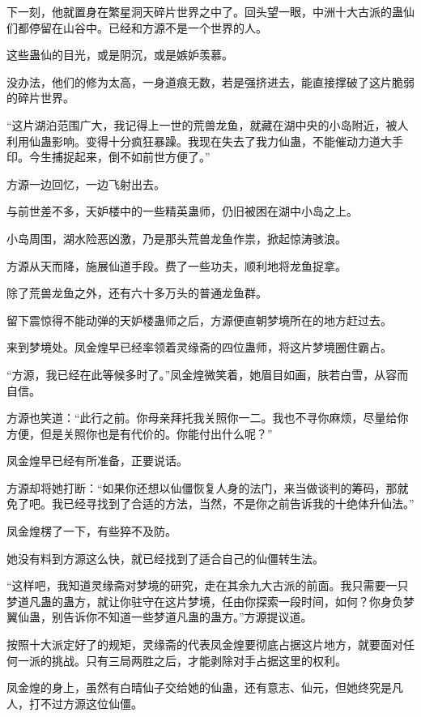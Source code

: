\begin{this_body}
下一刻，他就置身在繁星洞天碎片世界之中了。回头望一眼，中洲十大古派的蛊仙们都停留在山谷中。已经和方源不是一个世界的人。

这些蛊仙的目光，或是阴沉，或是嫉妒羡慕。

没办法，他们的修为太高，一身道痕无数，若是强挤进去，能直接撑破了这片脆弱的碎片世界。

“这片湖泊范围广大，我记得上一世的荒兽龙鱼，就藏在湖中央的小岛附近，被人利用仙蛊影响。变得十分疯狂暴躁。我现在失去了我力仙蛊，不能催动力道大手印。今生捕捉起来，倒不如前世方便了。”

方源一边回忆，一边飞射出去。

与前世差不多，天妒楼中的一些精英蛊师，仍旧被困在湖中小岛之上。

小岛周围，湖水险恶凶激，乃是那头荒兽龙鱼作祟，掀起惊涛骇浪。

方源从天而降，施展仙道手段。费了一些功夫，顺利地将龙鱼捉拿。

除了荒兽龙鱼之外，还有六十多万头的普通龙鱼群。

留下震惊得不能动弹的天妒楼蛊师之后，方源便直朝梦境所在的地方赶过去。

来到梦境处。凤金煌早已经率领着灵缘斋的四位蛊师，将这片梦境圈住霸占。

“方源，我已经在此等候多时了。”凤金煌微笑着，她眉目如画，肤若白雪，从容而自信。

方源也笑道：“此行之前。你母亲拜托我关照你一二。我也不寻你麻烦，尽量给你方便，但是关照你也是有代价的。你能付出什么呢？”

凤金煌早已经有所准备，正要说话。

方源却将她打断：“如果你还想以仙僵恢复人身的法门，来当做谈判的筹码，那就免了吧。我已经寻找到了合适的方法，当然，不是你之前告诉我的十绝体升仙法。”

凤金煌楞了一下，有些猝不及防。

她没有料到方源这么快，就已经找到了适合自己的仙僵转生法。

“这样吧，我知道灵缘斋对梦境的研究，走在其余九大古派的前面。我只需要一只梦道凡蛊的蛊方，就让你驻守在这片梦境，任由你探索一段时间，如何？你身负梦翼仙蛊，别告诉你不知道一些梦道凡蛊的蛊方。”方源提议道。

按照十大派定好了的规矩，灵缘斋的代表凤金煌要彻底占据这片地方，就要面对任何一派的挑战。只有三局两胜之后，才能剥除对手占据这里的权利。

凤金煌的身上，虽然有白晴仙子交给她的仙蛊，还有意志、仙元，但她终究是凡人，打不过方源这位仙僵。


\end{this_body}
